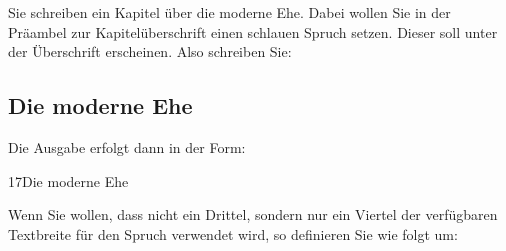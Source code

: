   \begin{Example}
    Sie schreiben ein Kapitel über die moderne Ehe. Dabei wollen Sie in der
    Präambel zur Kapitelüberschrift einen schlauen Spruch setzen. Dieser soll
    unter der Überschrift erscheinen. Also schreiben Sie:
\begin{lstcode}
  \chapter{Die moderne Ehe}
\end{lstcode}
    Die Ausgabe erfolgt dann in der Form:
    \begin{ShowOutput}
      {\Large
        17\enskip Die moderne Ehe\raggedright\par}
      \vspace{\baselineskip}
    \end{ShowOutput}

    Wenn Sie wollen, dass nicht ein Drittel, sondern nur ein Viertel der
    verfügbaren Textbreite für den Spruch verwendet wird, so definieren Sie
     wie folgt um:
\begin{lstcode}
  \renewcommand*{\dictumwidth}{.25\textwidth}
\end{lstcode}
  \end{Example}

%
\fi
%
\EndIndexGroup
%
\EndIndexGroup


